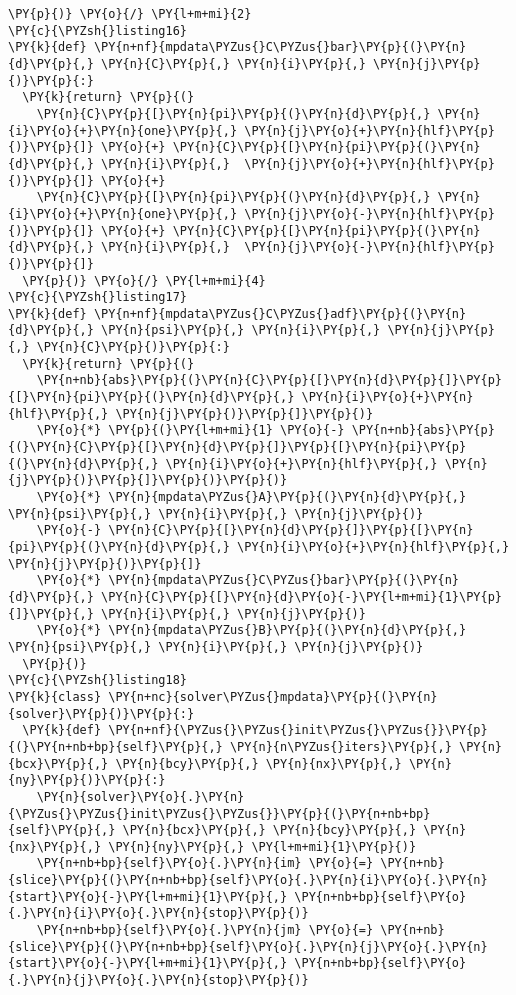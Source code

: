 \begin{Verbatim}[commandchars=\\\{\}]
  \PY{p}{)} \PY{o}{/} \PY{l+m+mi}{2}
\PY{c}{\PYZsh{}listing16}
\PY{k}{def} \PY{n+nf}{mpdata\PYZus{}C\PYZus{}bar}\PY{p}{(}\PY{n}{d}\PY{p}{,} \PY{n}{C}\PY{p}{,} \PY{n}{i}\PY{p}{,} \PY{n}{j}\PY{p}{)}\PY{p}{:}
  \PY{k}{return} \PY{p}{(}
    \PY{n}{C}\PY{p}{[}\PY{n}{pi}\PY{p}{(}\PY{n}{d}\PY{p}{,} \PY{n}{i}\PY{o}{+}\PY{n}{one}\PY{p}{,} \PY{n}{j}\PY{o}{+}\PY{n}{hlf}\PY{p}{)}\PY{p}{]} \PY{o}{+} \PY{n}{C}\PY{p}{[}\PY{n}{pi}\PY{p}{(}\PY{n}{d}\PY{p}{,} \PY{n}{i}\PY{p}{,}  \PY{n}{j}\PY{o}{+}\PY{n}{hlf}\PY{p}{)}\PY{p}{]} \PY{o}{+}
    \PY{n}{C}\PY{p}{[}\PY{n}{pi}\PY{p}{(}\PY{n}{d}\PY{p}{,} \PY{n}{i}\PY{o}{+}\PY{n}{one}\PY{p}{,} \PY{n}{j}\PY{o}{-}\PY{n}{hlf}\PY{p}{)}\PY{p}{]} \PY{o}{+} \PY{n}{C}\PY{p}{[}\PY{n}{pi}\PY{p}{(}\PY{n}{d}\PY{p}{,} \PY{n}{i}\PY{p}{,}  \PY{n}{j}\PY{o}{-}\PY{n}{hlf}\PY{p}{)}\PY{p}{]} 
  \PY{p}{)} \PY{o}{/} \PY{l+m+mi}{4}
\PY{c}{\PYZsh{}listing17}
\PY{k}{def} \PY{n+nf}{mpdata\PYZus{}C\PYZus{}adf}\PY{p}{(}\PY{n}{d}\PY{p}{,} \PY{n}{psi}\PY{p}{,} \PY{n}{i}\PY{p}{,} \PY{n}{j}\PY{p}{,} \PY{n}{C}\PY{p}{)}\PY{p}{:}
  \PY{k}{return} \PY{p}{(}
    \PY{n+nb}{abs}\PY{p}{(}\PY{n}{C}\PY{p}{[}\PY{n}{d}\PY{p}{]}\PY{p}{[}\PY{n}{pi}\PY{p}{(}\PY{n}{d}\PY{p}{,} \PY{n}{i}\PY{o}{+}\PY{n}{hlf}\PY{p}{,} \PY{n}{j}\PY{p}{)}\PY{p}{]}\PY{p}{)} 
    \PY{o}{*} \PY{p}{(}\PY{l+m+mi}{1} \PY{o}{-} \PY{n+nb}{abs}\PY{p}{(}\PY{n}{C}\PY{p}{[}\PY{n}{d}\PY{p}{]}\PY{p}{[}\PY{n}{pi}\PY{p}{(}\PY{n}{d}\PY{p}{,} \PY{n}{i}\PY{o}{+}\PY{n}{hlf}\PY{p}{,} \PY{n}{j}\PY{p}{)}\PY{p}{]}\PY{p}{)}\PY{p}{)} 
    \PY{o}{*} \PY{n}{mpdata\PYZus{}A}\PY{p}{(}\PY{n}{d}\PY{p}{,} \PY{n}{psi}\PY{p}{,} \PY{n}{i}\PY{p}{,} \PY{n}{j}\PY{p}{)}
    \PY{o}{-} \PY{n}{C}\PY{p}{[}\PY{n}{d}\PY{p}{]}\PY{p}{[}\PY{n}{pi}\PY{p}{(}\PY{n}{d}\PY{p}{,} \PY{n}{i}\PY{o}{+}\PY{n}{hlf}\PY{p}{,} \PY{n}{j}\PY{p}{)}\PY{p}{]} 
    \PY{o}{*} \PY{n}{mpdata\PYZus{}C\PYZus{}bar}\PY{p}{(}\PY{n}{d}\PY{p}{,} \PY{n}{C}\PY{p}{[}\PY{n}{d}\PY{o}{-}\PY{l+m+mi}{1}\PY{p}{]}\PY{p}{,} \PY{n}{i}\PY{p}{,} \PY{n}{j}\PY{p}{)}
    \PY{o}{*} \PY{n}{mpdata\PYZus{}B}\PY{p}{(}\PY{n}{d}\PY{p}{,} \PY{n}{psi}\PY{p}{,} \PY{n}{i}\PY{p}{,} \PY{n}{j}\PY{p}{)}
  \PY{p}{)}
\PY{c}{\PYZsh{}listing18}
\PY{k}{class} \PY{n+nc}{solver\PYZus{}mpdata}\PY{p}{(}\PY{n}{solver}\PY{p}{)}\PY{p}{:}
  \PY{k}{def} \PY{n+nf}{\PYZus{}\PYZus{}init\PYZus{}\PYZus{}}\PY{p}{(}\PY{n+nb+bp}{self}\PY{p}{,} \PY{n}{n\PYZus{}iters}\PY{p}{,} \PY{n}{bcx}\PY{p}{,} \PY{n}{bcy}\PY{p}{,} \PY{n}{nx}\PY{p}{,} \PY{n}{ny}\PY{p}{)}\PY{p}{:}
    \PY{n}{solver}\PY{o}{.}\PY{n}{\PYZus{}\PYZus{}init\PYZus{}\PYZus{}}\PY{p}{(}\PY{n+nb+bp}{self}\PY{p}{,} \PY{n}{bcx}\PY{p}{,} \PY{n}{bcy}\PY{p}{,} \PY{n}{nx}\PY{p}{,} \PY{n}{ny}\PY{p}{,} \PY{l+m+mi}{1}\PY{p}{)}
    \PY{n+nb+bp}{self}\PY{o}{.}\PY{n}{im} \PY{o}{=} \PY{n+nb}{slice}\PY{p}{(}\PY{n+nb+bp}{self}\PY{o}{.}\PY{n}{i}\PY{o}{.}\PY{n}{start}\PY{o}{-}\PY{l+m+mi}{1}\PY{p}{,} \PY{n+nb+bp}{self}\PY{o}{.}\PY{n}{i}\PY{o}{.}\PY{n}{stop}\PY{p}{)}
    \PY{n+nb+bp}{self}\PY{o}{.}\PY{n}{jm} \PY{o}{=} \PY{n+nb}{slice}\PY{p}{(}\PY{n+nb+bp}{self}\PY{o}{.}\PY{n}{j}\PY{o}{.}\PY{n}{start}\PY{o}{-}\PY{l+m+mi}{1}\PY{p}{,} \PY{n+nb+bp}{self}\PY{o}{.}\PY{n}{j}\PY{o}{.}\PY{n}{stop}\PY{p}{)}


\end{Verbatim}
